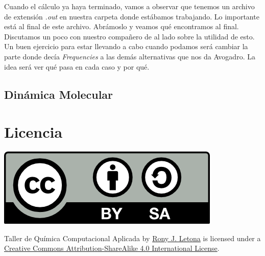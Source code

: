 \documentclass[10pt,letterpaper]{article}
\begin{document}
Cuando el c\'alculo ya haya terminado, vamos a observar que tenemos un archivo de extensi\'on \emph{.out} en nuestra carpeta donde est\'abamos trabajando. Lo importante est\'a al final de este archivo. Abr\'amoslo y veamos qu\'e encontramos al final. Discutamos un poco con nuestro compa\~nero de al lado sobre la utilidad de esto.\\

Un buen ejercicio para estar llevando a cabo cuando podamos ser\'a cambiar la parte donde dec\'ia \emph{Frequencies} a las dem\'as alternativas que nos da Avogadro. La idea ser\'a ver qu\'e pasa en cada caso y por qu\'e.

\subsection{Din\'amica Molecular}

\section*{Licencia}

\noindent \includegraphics{img/cc_big.png}

\noindent Taller de Qu\'imica Computacional Aplicada by \href{http://github.com/zronyj/TQCA}{Rony J. Letona} is licensed under a \href{http://creativecommons.org/licenses/by-sa/4.0/}{Creative Commons Attribution-ShareAlike 4.0 International License}.
\end{document}
